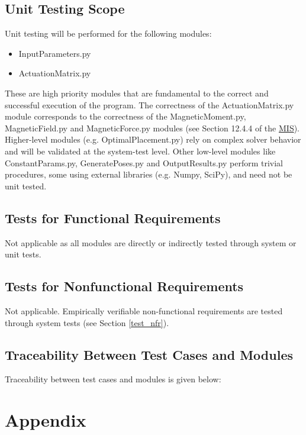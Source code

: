 \documentclass[12pt, titlepage]{article}
\begin{document}
\subsection{Unit Testing Scope}
Unit testing will be performed for the following modules: 
\begin{itemize}
  \item InputParameters.py 
  \item ActuationMatrix.py
\end{itemize}
These are high priority modules that are fundamental to the correct and successful execution of the program. The correctness of the ActuationMatrix.py module corresponds to the correctness of the MagneticMoment.py, MagneticField.py and MagneticForce.py modules (see Section 12.4.4 of the \href{https://github.com/husseinsd1/optimal-em-arrangement/blob/main/docs/Design/SoftDetailedDes/MIS.pdf}{MIS}). Higher-level modules (e.g. OptimalPlacement.py) rely on complex solver behavior and will be validated at the system-test level. Other low-level modules like ConstantParams.py, GeneratePoses.py and OutputResults.py perform trivial procedures, some using external libraries (e.g. Numpy, SciPy), and need not be unit tested. 


\subsection{Tests for Functional Requirements}
Not applicable as all modules are directly or indirectly tested through system or unit tests. 

\subsection{Tests for Nonfunctional Requirements}
Not applicable. Empirically verifiable non-functional requirements are tested through system tests (see Section \ref{test_nfr}).

\subsection{Traceability Between Test Cases and Modules}
Traceability between test cases and modules is given below:



\newpage





\newpage

\section{Appendix}
\end{document}

